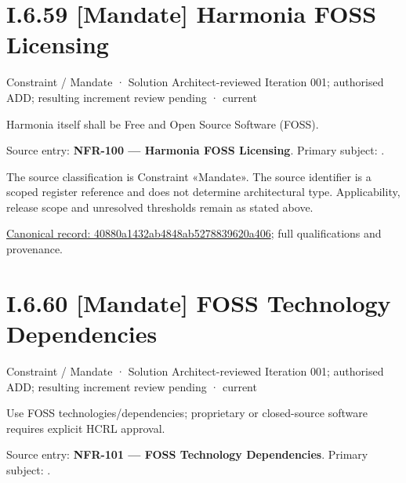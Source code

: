 \section*{I.6.59 [Mandate] Harmonia FOSS Licensing}
\label{navigation:I.6.59}

\label{element:40880a1432ab4848ab5278839620a406}
{\small Constraint / Mandate · Solution Architect-reviewed Iteration 001; authorised ADD; resulting increment review pending · current}\par

Harmonia itself shall be Free and Open Source Software (FOSS).



Source entry: \textbf{NFR-100 — Harmonia FOSS Licensing}. Primary subject: \texttt{}.



The source classification is Constraint «Mandate». The source identifier is a scoped register reference and does not determine architectural type. Applicability, release scope and unresolved thresholds remain as stated above.


{\footnotesize \href{../../../../../../../continuum/motivation/constraint/mandate/40880a1432ab4848ab5278839620a406.md}{Canonical record: 40880a1432ab4848ab5278839620a406}; full qualifications and provenance.}\par
\section*{I.6.60 [Mandate] FOSS Technology Dependencies}
\label{navigation:I.6.60}

\label{element:13c56fcda53c406494561c883f32fc1c}
{\small Constraint / Mandate · Solution Architect-reviewed Iteration 001; authorised ADD; resulting increment review pending · current}\par

Use FOSS technologies/dependencies; proprietary or closed-source software requires explicit HCRL approval.



Source entry: \textbf{NFR-101 — FOSS Technology Dependencies}. Primary subject: \texttt{}.



